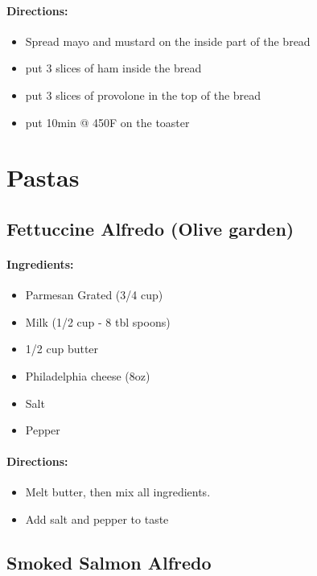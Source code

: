 \documentclass{article}
\begin{document}
\paragraph{Directions:}
\begin{itemize}
	\item Spread mayo and mustard on the inside part of the bread 
	\item put 3 slices of ham inside the bread 
	\item put 3 slices of provolone in the top of the bread 
	\item put 10min @ 450F on the toaster 
\end{itemize}

\section{Pastas}

\subsection{Fettuccine Alfredo (Olive garden)}

\paragraph{Ingredients:}

\begin{itemize}
  \item Parmesan Grated (3/4 cup)
  \item Milk (1/2 cup - 8 tbl spoons)
  \item 1/2 cup butter
  \item Philadelphia cheese (8oz)
  \item Salt
  \item Pepper
\end{itemize}

\paragraph{Directions:}
\begin{itemize}
  \item Melt butter, then mix all ingredients.
  \item Add salt and pepper to taste
\end{itemize}

\subsection{Smoked Salmon Alfredo}
\end{document}
